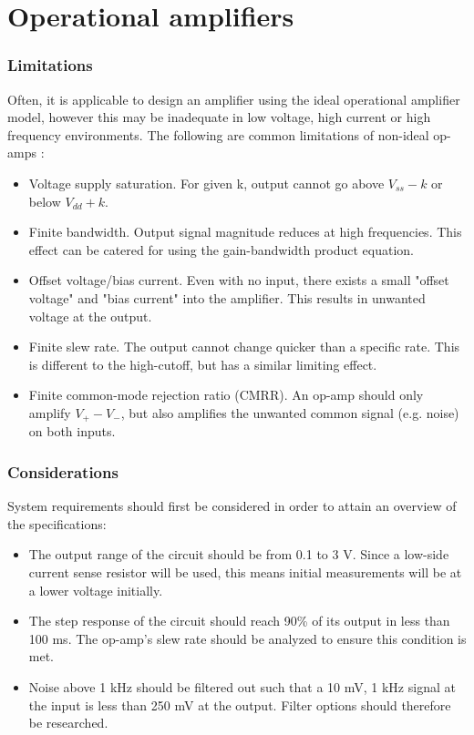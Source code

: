 \graphicspath{{content/chapter1/figures/}}
\section{Operational amplifiers}\label{sec:opamps}

\subsubsection{Limitations}\label{sec:opamps_limits}
Often, it is applicable to design an amplifier using the ideal operational amplifier model, however this may be inadequate
in low voltage, high current or high frequency environments. The following are common limitations of non-ideal op-amps \cite{opAmpLimitations}:
\begin{itemize}
    \item Voltage supply saturation. For given k, output cannot go above $V_{ss} - k$ or below  $V_{dd} + k$.
    \item Finite bandwidth. Output signal magnitude reduces at high frequencies. This effect can be catered for using the gain-bandwidth product equation.
    \item Offset voltage/bias current. Even with no input, there exists a small "offset voltage" and "bias current" into the amplifier.
          This results in unwanted voltage at the output.
    \item Finite slew rate. The output cannot change quicker than a specific rate. This is different to the high-cutoff, but has a similar limiting effect.
    \item Finite common-mode rejection ratio (CMRR). An op-amp should only amplify $V_{+} - V_{-}$, but also amplifies the unwanted common signal (e.g. noise) on both inputs.
\end{itemize}

\subsubsection{Considerations}\label{sec:opamps_considerations}
System requirements should first be considered in order to attain an overview of the specifications:
\begin{itemize}
    \item The output range of the circuit should be from 0.1 to 3 V. Since a low-side current sense resistor will be used, this means initial measurements will be at a lower voltage initially.
    \item The step response of the circuit should reach 90\% of its output in less than 100 ms. The op-amp's slew rate should be analyzed to ensure this condition is met.
    \item Noise above 1 kHz should be filtered out such that a 10 mV, 1 kHz signal at the input is less than 250 mV at the output. Filter options should therefore be researched.
\end{itemize}

